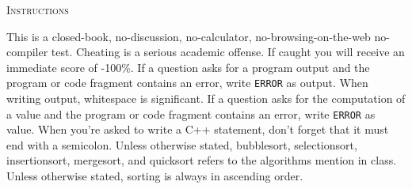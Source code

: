 \textsc{Instructions}
\begin{enumerate}
\li This is a closed-book, no-discussion, no-calculator, no-browsing-on-the-web
    no-compiler test.
\li Cheating is a serious academic offense. If caught you will 
    receive an immediate score of -100\%.
\li If a question asks for a program output and the program or
    code fragment contains
    an error, write \verb!ERROR! as output.
    When writing output, whitespace is significant.
\li If a question asks for the computation of a value and the program or
    code fragment contains
    an error, write \verb!ERROR! as value.
\li When you're asked to write a C++ statement, don't forget that it must
    end with a semicolon.
\li Unless otherwise stated, bubblesort, selectionsort,
    insertionsort, mergesort, and quicksort refers to the
    algorithms mention in class.
    Unless otherwise stated, sorting is always in ascending order.
\end{enumerate}

\vspace{1cm}
